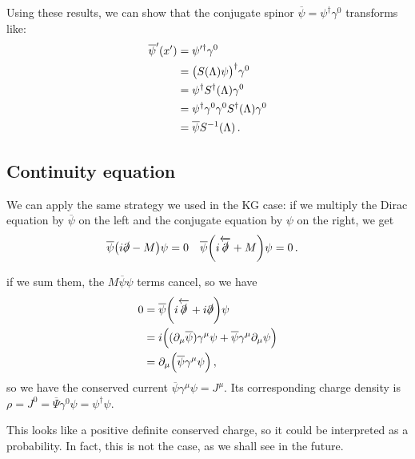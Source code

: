 \documentclass[main.tex]{subfiles}
\begin{document}
Using these results, we can show that the conjugate spinor \(\overline{\psi} = \psi ^\dag \gamma^{0}\) transforms like: 
%
\begin{subequations} \label{eq:dirac-conjugate-spinor-transformation}
\begin{align}
\overline{\psi}' (x') &= \psi^{\prime \dag} \gamma^{0}  \\
&= \qty(S(\Lambda ) \psi ) ^\dag \gamma^{0}  \\
&= \psi ^\dag S ^\dag (\Lambda ) \gamma^{0} \\
&= \psi ^\dag \gamma^{0} \gamma^{0} S ^\dag (\Lambda ) \gamma^{0} \\
&= \overline{\psi} S^{-1}(\Lambda ) 
\,.
\end{align}
\end{subequations}

\subsection{Continuity equation}

We can apply the same strategy we used in the KG case: if we multiply the Dirac equation by \(\overline{\psi}\) on the left and the conjugate equation by \(\psi \) on the right, we get 
%
\begin{align}
\overline{\psi} \qty(i \slashed{\partial} - M ) \psi &= 0 &
\overline{\psi} \qty(i \overleftarrow{\slashed{\partial}} + M ) \psi &= 0 
\,.
\end{align}

if we sum them, the \(M \overline{\psi} \psi  \) terms cancel, so we have 
%
\begin{subequations}
\begin{align}
0 &= \overline{\psi} \qty(i \overleftarrow{\slashed{\partial}} + i \slashed{\partial}) \psi   \\
&= i \qty( (\partial_{\mu }\overline{\psi}) \gamma^{\mu } \psi   + \overline{\psi} \gamma^{\mu }\partial_{\mu } \psi)  \\
&= \partial_{\mu } \qty(\overline{\psi} \gamma^{\mu } \psi )
\,,
\end{align}
\end{subequations}
%
so we have the conserved current \(\overline{\psi} \gamma^{ \mu } \psi   = J^{\mu }\).
Its corresponding charge density is \(\rho = J^{0}= \overline{\Psi} \gamma^{0} \psi = \psi ^\dag \psi \). 

This looks like a positive definite conserved charge, so it could be interpreted as a probability. 
In fact, this is not the case, as we shall see in the future. 
\end{document}
